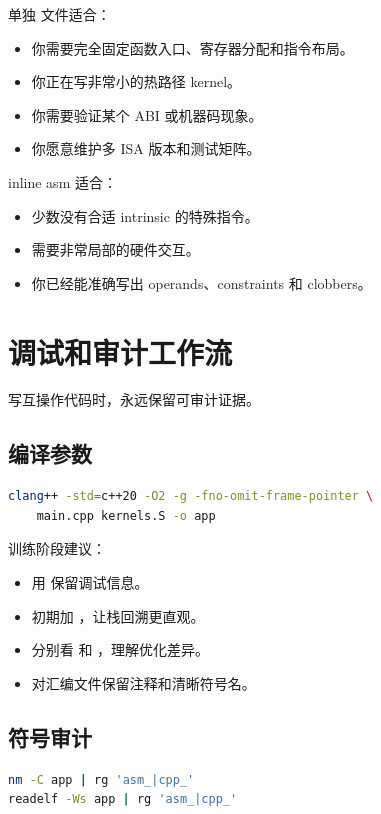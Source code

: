 单独  文件适合：

\begin{itemize}
  \item 你需要完全固定函数入口、寄存器分配和指令布局。
  \item 你正在写非常小的热路径 kernel。
  \item 你需要验证某个 ABI 或机器码现象。
  \item 你愿意维护多 ISA 版本和测试矩阵。
\end{itemize}

inline asm 适合：

\begin{itemize}
  \item 少数没有合适 intrinsic 的特殊指令。
  \item 需要非常局部的硬件交互。
  \item 你已经能准确写出 operands、constraints 和 clobbers。
\end{itemize}

\section{调试和审计工作流}

写互操作代码时，永远保留可审计证据。

\subsection{编译参数}

\begin{lstlisting}[language=bash]
clang++ -std=c++20 -O2 -g -fno-omit-frame-pointer \
    main.cpp kernels.S -o app
\end{lstlisting}

训练阶段建议：

\begin{itemize}
  \item 用  保留调试信息。
  \item 初期加 ，让栈回溯更直观。
  \item 分别看  和 ，理解优化差异。
  \item 对汇编文件保留注释和清晰符号名。
\end{itemize}

\subsection{符号审计}

\begin{lstlisting}[language=bash]
nm -C app | rg 'asm_|cpp_'
readelf -Ws app | rg 'asm_|cpp_'
\end{lstlisting}

